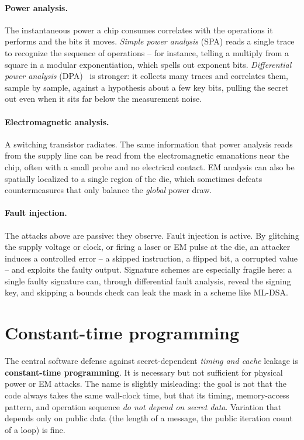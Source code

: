 \paragraph{Power analysis.}
The instantaneous power a chip consumes correlates with the operations it performs
and the bits it moves. \emph{Simple power analysis} (SPA) reads a single trace to
recognize the sequence of operations -- for instance, telling a multiply from a
square in a modular exponentiation, which spells out exponent bits. \emph{Differential
power analysis} (DPA)~\cite{kjj1999} is stronger: it collects many traces and correlates them,
sample by sample, against a hypothesis about a few key bits, pulling the secret out
even when it sits far below the measurement noise.

\paragraph{Electromagnetic analysis.}
A switching transistor radiates. The same information that power analysis reads from
the supply line can be read from the electromagnetic emanations near the chip, often
with a small probe and no electrical contact. EM analysis can also be spatially
localized to a single region of the die, which sometimes defeats countermeasures that
only balance the \emph{global} power draw.

\paragraph{Fault injection.}
The attacks above are passive: they observe. Fault injection is active. By glitching
the supply voltage or clock, or firing a laser or EM pulse at the die, an attacker
induces a controlled error -- a skipped instruction, a flipped bit, a corrupted
value -- and exploits the faulty output. Signature schemes are especially fragile
here: a single faulty signature can, through differential fault analysis, reveal the
signing key, and skipping a bounds check can leak the mask in a scheme like ML-DSA.

\section{Constant-time programming}

The central software defense against secret-dependent \emph{timing and cache} leakage is \textbf{constant-time programming}. It is necessary but not sufficient for physical power or EM attacks. The name is slightly misleading: the
goal is not that the code always takes the same wall-clock time, but that its timing,
memory-access pattern, and operation sequence \emph{do not depend on secret data}.
Variation that depends only on public data (the length of a message, the public
iteration count of a loop) is fine.

